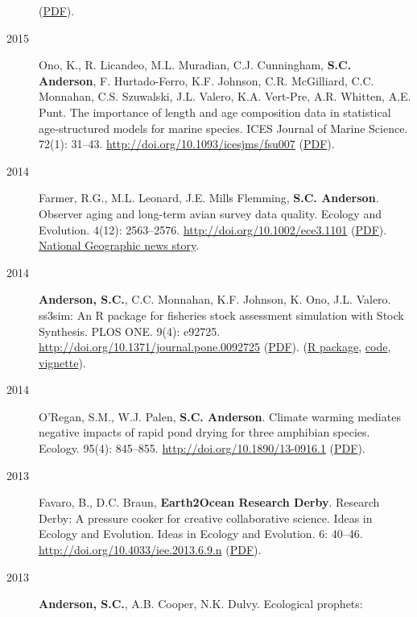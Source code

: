 \begin{description}
(\href{http://icesjms.oxfordjournals.org/content/early/2014/04/09/icesjms.fsu055.full.pdf?keytype=ref\&ijkey=NEXmZIkz3289u3z}{PDF}).
\item[2015]
Ono, K., R. Licandeo, M.L. Muradian, C.J. Cunningham, \textbf{S.C.
Anderson}, F. Hurtado-Ferro, K.F. Johnson, C.R. McGilliard, C.C.
Monnahan, C.S. Szuwalski, J.L. Valero, K.A. Vert-Pre, A.R. Whitten, A.E.
Punt. The importance of length and age composition data in statistical
age-structured models for marine species. ICES Journal of Marine
Science. 72(1): 31--43. \url{http://doi.org/10.1093/icesjms/fsu007}
(\href{http://icesjms.oxfordjournals.org/content/early/2014/02/20/icesjms.fsu007.full.pdf}{PDF}).
\item[2014]
Farmer, R.G., M.L. Leonard, J.E. Mills Flemming, \textbf{S.C. Anderson}.
Observer aging and long-term avian survey data quality. Ecology and
Evolution. 4(12): 2563--2576. \url{http://doi.org/10.1002/ece3.1101}
(\href{http://onlinelibrary.wiley.com/doi/10.1002/ece3.1101/pdf}{PDF}).
\href{http://news.nationalgeographic.com/news/2014/08/140805-aging-birders-breeding-bird-survey-volunteers-science/}{National
Geographic news story}.
\item[2014]
\textbf{Anderson, S.C.}, C.C. Monnahan, K.F. Johnson, K. Ono, J.L.
Valero. ss3sim: An R package for fisheries stock assessment simulation
with Stock Synthesis. PLOS ONE. 9(4): e92725.
\url{http://doi.org/10.1371/journal.pone.0092725}
(\href{http://www.plosone.org/article/fetchObject.action?uri=info\%3Adoi\%2F10.1371\%2Fjournal.pone.0092725\&representation=PDF}{PDF}).
(\href{http://cran.r-project.org/web/packages/ss3sim/index.html}{R
package}, \href{https://github.com/ss3sim/ss3sim}{code},
\href{https://dl.dropboxusercontent.com/u/254940/ss3sim-vignette.pdf}{vignette}).
\item[2014]
O'Regan, S.M., W.J. Palen, \textbf{S.C. Anderson}. Climate warming
mediates negative impacts of rapid pond drying for three amphibian
species. Ecology. 95(4): 845--855.
\url{http://doi.org/10.1890/13-0916.1}
(\href{http://www.esajournals.org/doi/pdf/10.1890/13-0916.1}{PDF}).
\item[2013]
Favaro, B., D.C. Braun, \textbf{Earth2Ocean Research Derby}. Research
Derby: A pressure cooker for creative collaborative science. Ideas in
Ecology and Evolution. Ideas in Ecology and Evolution. 6: 40--46.
\url{http://doi.org/10.4033/iee.2013.6.9.n}
(\href{http://library.queensu.ca/ojs/index.php/IEE/article/download/4931/4899}{PDF}).
\item[2013]
\textbf{Anderson, S.C.}, A.B. Cooper, N.K. Dulvy. Ecological prophets:

\end{description}
